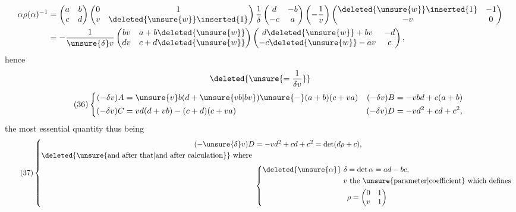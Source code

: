 \[
\begin{aligned}
\alpha\rho(\alpha)^{-1}
&=\begin{pmatrix}a&b\\c&d\end{pmatrix}
\begin{pmatrix}0&1\\v&\deleted{\unsure{w}}\inserted{1}\end{pmatrix}
\frac1\delta\begin{pmatrix}d&-b\\-c&a\end{pmatrix}
\left(-\frac1v\right)
\begin{pmatrix}\deleted{\unsure{w}}\inserted{1}&-1\\-v&0\end{pmatrix}\\
&=-\frac1{\unsure{\delta}v}
\begin{pmatrix}bv&a+b\deleted{\unsure{w}}\\dv&c+d\deleted{\unsure{w}}\end{pmatrix}
\begin{pmatrix}d\deleted{\unsure{w}}+bv&-d\\-c\deleted{\unsure{w}}-av&c\end{pmatrix},
\end{aligned}
\]
hence
\[
\deleted{\unsure{=\frac1{\delta v}}}
\]
\[
\tag{36}
\left\{\begin{aligned}
(-\delta v)A&=\unsure{v}b(d+\unsure{vb|bv})\unsure{-}(a+b)(c+va)
&(-\delta v)B&=-vbd+c(a+b)\\
(-\delta v)C&=vd(d+vb)-(c+d)(c+va)
&(-\delta v)D&=-vd^2+cd+c^2,
\end{aligned}\right.
\]
the most essential quantity thus being
\[
\tag{37}
\left\{\begin{aligned}
(-\unsure{\delta}v)D&=-vd^2+cd+c^2=\det(d\rho+c),\\
\text{\deleted{\unsure{and after that|and after calculation}} where }&\\[3pt]
&\left\{\begin{aligned}
\deleted{\unsure{\alpha}}\ \delta&=\det\alpha=ad-bc,\\
v&\ \text{the \unsure{parameter|coefficient} which defines }\\&\rho=\begin{pmatrix}0&1\\v&1\end{pmatrix}
\end{aligned}\right.
\end{aligned}\right.
\]
